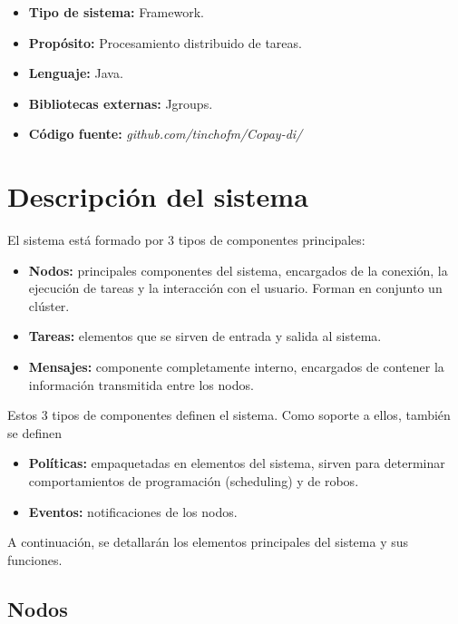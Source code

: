 \documentclass[12pt,a4paper,oneside,spanish]{report}
\begin{document}
\begin{itemize}
	\item \textbf{Tipo de sistema:} Framework.
	\item \textbf{Propósito:} Procesamiento distribuido de tareas.
    \item \textbf{Lenguaje:} Java\cite{url:Java}.
    	\item \textbf{Bibliotecas externas:} Jgroups\cite{url:JGroups}.
    	\item \textbf{Código fuente:} \textit{github.com/tinchofm/Copay-di/}
\end{itemize}

\section*{Descripción del sistema}

El sistema está formado por 3 tipos de componentes principales:

\begin{itemize}
	\item \textbf{Nodos:} principales componentes del sistema, encargados de la conexión, la ejecución de tareas y la interacción con el usuario. Forman en conjunto un clúster.
	\item \textbf{Tareas:} elementos que se sirven de entrada y salida al sistema.
	\item \textbf{Mensajes:} componente completamente interno, encargados de contener la información transmitida entre los nodos.
\end{itemize}

Estos 3 tipos de componentes definen el sistema. Como soporte a ellos, también se definen

\begin{itemize}
	\item \textbf{Políticas:} empaquetadas en elementos del sistema, sirven para determinar comportamientos de programación (scheduling) y de robos.
	\item \textbf{Eventos:} notificaciones de los nodos.
\end{itemize}

A continuación, se detallarán los elementos principales del sistema y sus funciones.

\subsection*{Nodos}
\label{sec:nodos}
\end{document}

